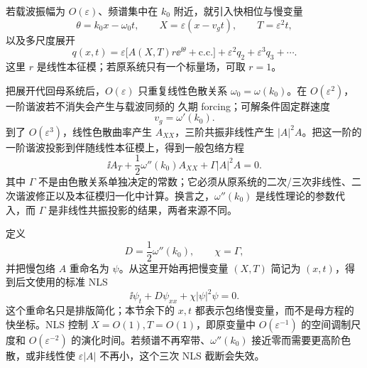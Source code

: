 若载波振幅为 $O(\varepsilon)$、频谱集中在 $k_0$ 附近，就引入快相位与慢变量
\[
\theta=k_0x-\omega_0t,
\qquad
X=\varepsilon(x-v_gt),
\qquad
T=\varepsilon^2t,
\]
以及多尺度展开
\[
q(x,t)=\varepsilon\bigl[A(X,T)r\ee^{\ii\theta}+\text{c.c.}\bigr]
+\varepsilon^2q_2+\varepsilon^3q_3+\cdots.
\]
这里 $r$ 是线性本征模；若原系统只有一个标量场，可取 $r=1$。

把展开代回母系统后，$O(\varepsilon)$ 只重复线性色散关系 $\omega_0=\omega(k_0)$。在 $O(\varepsilon^2)$，一阶谐波若不消失会产生与载波同频的 久期 forcing；可解条件固定群速度
\[
{v_g=\omega'(k_0)}.
\]
到了 $O(\varepsilon^3)$，线性色散曲率产生 $A_{XX}$，三阶共振非线性产生 $|A|^2A$。把这一阶的一阶谐波投影到伴随线性本征模上，得到一般包络方程
\begin{equation*}{
\ii A_T+\frac12\omega''(k_0)A_{XX}+\Gamma|A|^2A=0
}.\end{equation*}
其中 $\Gamma$ 不是由色散关系单独决定的常数；它必须从原系统的二次/三次非线性、二次谐波修正以及本征模归一化中计算。换言之，$\omega''(k_0)$ 是线性理论的参数代入，而 $\Gamma$ 是非线性共振投影的结果，两者来源不同。

定义
\begin{equation*}D=\frac12\omega''(k_0),
\qquad
\chi=\Gamma,\end{equation*}
并把慢包络 $A$ 重命名为 $\psi$。从这里开始再把慢变量 $(X,T)$ 简记为 $(x,t)$，得到后文使用的标准 NLS
\begin{equation}
{
\ii\psi_t+D\psi_{xx}+\chi|\psi|^2\psi=0
}.
\label{eq:nls-general}
\end{equation}
这个重命名只是排版简化；本节余下的 $x,t$ 都表示包络慢变量，而不是母方程的快坐标。NLS 控制 $X=O(1),T=O(1)$，即原变量中 $O(\varepsilon^{-1})$ 的空间调制尺度和 $O(\varepsilon^{-2})$ 的演化时间。若频谱不再窄带、$\omega''(k_0)$ 接近零而需要更高阶色散，或非线性使 $\varepsilon|A|$ 不再小，这个三次 NLS 截断会失效。

